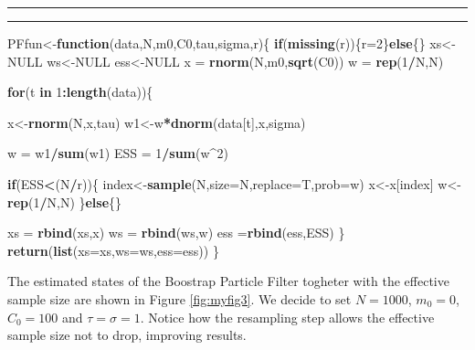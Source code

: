 \documentclass[
]{book}
\newenvironment{Shaded}{\begin{snugshade}}{\end{snugshade}}
\newcommand{\ControlFlowTok}[1]{\textcolor[rgb]{0.13,0.29,0.53}{\textbf{#1}}}
\newcommand{\DataTypeTok}[1]{\textcolor[rgb]{0.13,0.29,0.53}{#1}}
\newcommand{\DecValTok}[1]{\textcolor[rgb]{0.00,0.00,0.81}{#1}}
\newcommand{\KeywordTok}[1]{\textcolor[rgb]{0.13,0.29,0.53}{\textbf{#1}}}
\newcommand{\NormalTok}[1]{#1}
\newcommand{\OperatorTok}[1]{\textcolor[rgb]{0.81,0.36,0.00}{\textbf{#1}}}
\newcommand{\OtherTok}[1]{\textcolor[rgb]{0.56,0.35,0.01}{#1}}
\newcommand{\StringTok}[1]{\textcolor[rgb]{0.31,0.60,0.02}{#1}}
\theoremstyle{break}
\theoremstyle{nonumberplain}
\begin{document}
\hrule
\hrule

\begin{Shaded}
\begin{Highlighting}[]
\NormalTok{PFfun<-}\ControlFlowTok{function}\NormalTok{(data,N,m0,C0,tau,sigma,r)\{}
  \ControlFlowTok{if}\NormalTok{(}\KeywordTok{missing}\NormalTok{(r))\{r=}\DecValTok{2}\NormalTok{\}}\ControlFlowTok{else}\NormalTok{\{\}}
\NormalTok{  xs<-}\OtherTok{NULL}
\NormalTok{  ws<-}\OtherTok{NULL}
\NormalTok{  ess<-}\OtherTok{NULL}
\NormalTok{  x  =}\StringTok{ }\KeywordTok{rnorm}\NormalTok{(N,m0,}\KeywordTok{sqrt}\NormalTok{(C0))}
\NormalTok{  w  =}\StringTok{ }\KeywordTok{rep}\NormalTok{(}\DecValTok{1}\OperatorTok{/}\NormalTok{N,N)}
   
  \ControlFlowTok{for}\NormalTok{(t }\ControlFlowTok{in} \DecValTok{1}\OperatorTok{:}\KeywordTok{length}\NormalTok{(data))\{}
    
\NormalTok{    x<-}\KeywordTok{rnorm}\NormalTok{(N,x,tau)}
\NormalTok{    w1<-w}\OperatorTok{*}\KeywordTok{dnorm}\NormalTok{(data[t],x,sigma)}
    
\NormalTok{    w =}\StringTok{ }\NormalTok{w1}\OperatorTok{/}\KeywordTok{sum}\NormalTok{(w1)}
\NormalTok{    ESS  =}\StringTok{ }\DecValTok{1}\OperatorTok{/}\KeywordTok{sum}\NormalTok{(w}\OperatorTok{^}\DecValTok{2}\NormalTok{)}
    
    \ControlFlowTok{if}\NormalTok{(ESS}\OperatorTok{<}\NormalTok{(N}\OperatorTok{/}\NormalTok{r))\{}
\NormalTok{      index<-}\KeywordTok{sample}\NormalTok{(N,}\DataTypeTok{size=}\NormalTok{N,}\DataTypeTok{replace=}\NormalTok{T,}\DataTypeTok{prob=}\NormalTok{w)}
\NormalTok{      x<-x[index]}
\NormalTok{      w<-}\KeywordTok{rep}\NormalTok{(}\DecValTok{1}\OperatorTok{/}\NormalTok{N,N)}
\NormalTok{    \}}\ControlFlowTok{else}\NormalTok{\{\}}
    
\NormalTok{    xs =}\StringTok{ }\KeywordTok{rbind}\NormalTok{(xs,x)}
\NormalTok{    ws =}\StringTok{ }\KeywordTok{rbind}\NormalTok{(ws,w)}
\NormalTok{    ess =}\KeywordTok{rbind}\NormalTok{(ess,ESS)}
\NormalTok{  \}}
  \KeywordTok{return}\NormalTok{(}\KeywordTok{list}\NormalTok{(}\DataTypeTok{xs=}\NormalTok{xs,}\DataTypeTok{ws=}\NormalTok{ws,}\DataTypeTok{ess=}\NormalTok{ess))}
\NormalTok{\}}
\end{Highlighting}
\end{Shaded}

The estimated states of the Boostrap Particle Filter togheter with the
effective sample size are shown in Figure \ref{fig:myfig3}. We decide to
set \(N=1000\), \(m_{0}=0\), \(C_{0}=100\) and \(\tau=\sigma=1\). Notice
how the resampling step allows the effective sample size not to drop,
improving results.
\end{document}
